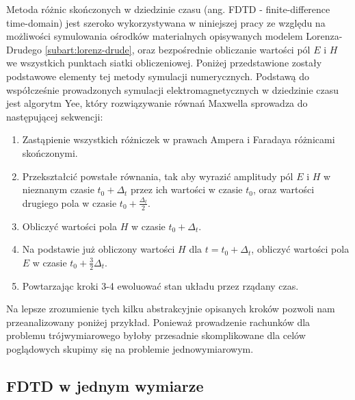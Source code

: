 Metoda różnic skończonych w dziedzinie czasu (ang. FDTD - finite-difference time-domain) jest szeroko wykorzystywana w niniejszej pracy ze względu na możliwości symulowania ośrodków materialnych opisywanych modelem Lorenza-Drudego \ref{subart:lorenz-drude}, oraz bezpośrednie obliczanie wartości pól $E$ i $H$ we wszystkich punktach siatki obliczeniowej. Poniżej przedstawione zostały podstawowe elementy tej metody symulacji numerycznych.
Podstawą do współcześnie prowadzonych symulacji elektromagnetycznych w dziedzinie czasu jest algorytm Yee\cite{1966ITAP14302Y}, który rozwiązywanie równań Maxwella sprowadza do następującej sekwencji:
\begin{enumerate}
\item Zastąpienie wszystkich różniczek w prawach Ampera i Faradaya różnicami skończonymi.
\item Przekształcić powstałe równania, tak aby wyrazić amplitudy pól $E$ i $H$ w nieznanym czasie $t_0 +  \Delta_t$ przez ich wartości w czasie $t_0$, oraz wartości drugiego pola w czasie $t_0+ \frac{\Delta_t}{2}$.
\item Obliczyć wartości pola $H$ w czasie $t_0 +  \Delta_t$.
\item Na podstawie już obliczony wartości $H$ dla $t=t_0+  \Delta_t$, obliczyć wartości pola $E$ w czasie $t_0 + \frac{3}{2} \Delta_t$.
\item Powtarzając kroki 3-4 ewoluować stan układu przez rządany czas.
\end{enumerate}
Na lepsze zrozumienie tych kilku abstrakcyjnie opisanych kroków pozwoli nam przeanalizowany poniżej przykład. Ponieważ prowadzenie rachunków dla problemu trójwymiarowego byłoby przesadnie skomplikowane dla celów poglądowych skupimy się na problemie jednowymiarowym.

\subsection{FDTD w jednym wymiarze}

